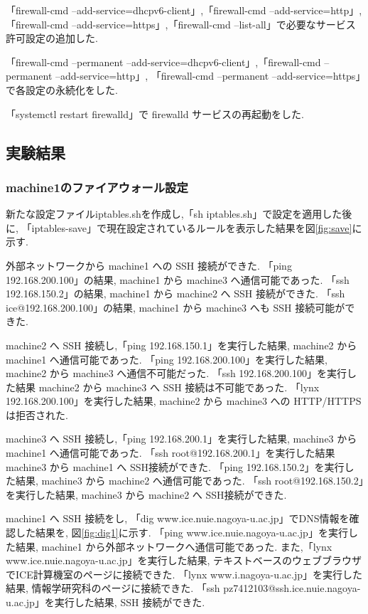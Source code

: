 \documentclass{ltjsarticle} %
\begin{document}
「firewall-cmd --add-service=dhcpv6-client」,「firewall-cmd --add-service=http」, 
「firewall-cmd --add-service=https」,「firewall-cmd --list-all」で必要なサービス許可設定の追加した. 

「firewall-cmd --permanent --add-service=dhcpv6-client」,「firewall-cmd --permanent --add-service=http」,
「firewall-cmd --permanent --add-service=https」で各設定の永続化をした. 

「systemctl restart firewalld」で firewalld サービスの再起動をした. 


\subsection{実験結果}

\subsubsection{machine1のファイアウォール設定}

新たな設定ファイルiptables.shを作成し,「sh iptables.sh」で設定を適用した後に, 
「iptables-save」で現在設定されているルールを表示した結果を図\ref{fig:save}に示す. 

外部ネットワークから machine1 への SSH 接続ができた. 
「ping 192.168.200.100」の結果,  machine1 から machine3 へ通信可能であった. 
「ssh 192.168.150.2」の結果, machine1 から machine2 へ SSH 接続ができた. 
「ssh ice@192.168.200.100」の結果, machine1 から machine3 へも SSH 接続可能ができた. 

machine2 へ SSH 接続し,「ping 192.168.150.1」を実行した結果, machine2 から machine1 へ通信可能であった. 
「ping 192.168.200.100」を実行した結果, machine2 から machine3 へ通信不可能だった. 
「ssh 192.168.200.100」を実行した結果 machine2 から machine3 へ SSH 接続は不可能であった. 
「lynx 192.168.200.100」を実行した結果, machine2 から machine3 への HTTP/HTTPS は拒否された. 

machine3 へ SSH 接続し,「ping 192.168.200.1」を実行した結果, machine3 から machine1 へ通信可能であった.  
「ssh root@192.168.200.1」を実行した結果 machine3 から machine1 へ SSH接続ができた. 
「ping 192.168.150.2」を実行した結果, machine3 から machine2 へ通信可能であった. 
「ssh root@192.168.150.2」を実行した結果, machine3 から machine2 へ SSH接続ができた. 

machine1 へ SSH 接続をし, 「dig www.ice.nuie.nagoya-u.ac.jp」でDNS情報を確認した結果を, 図\ref{fig:dig1}に示す. 
「ping www.ice.nuie.nagoya-u.ac.jp」を実行した結果, machine1 から外部ネットワークへ通信可能であった. 
また,「lynx www.ice.nuie.nagoya-u.ac.jp」を実行した結果, テキストベースのウェブブラウザでICE計算機室のページに接続できた. 
「lynx www.i.nagoya-u.ac.jp」を実行した結果, 情報学研究科のページに接続できた. 
「ssh pz7412103@ssh.ice.nuie.nagoya-u.ac.jp」を実行した結果, SSH 接続ができた. 
\end{document}
